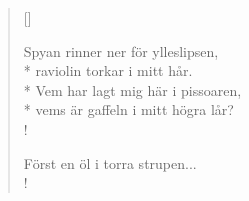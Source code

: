 \begin{verse}[\versewidth]

Spyan rinner ner för ylleslipsen,\\*
raviolin torkar i mitt hår.\\*
Vem har lagt mig här i pissoaren,\\*
vems är gaffeln i mitt högra lår?\\!


Först en öl i torra strupen...\\!




\end{verse}

